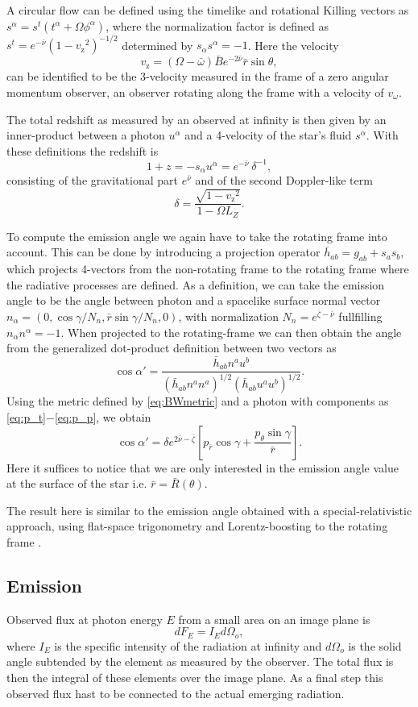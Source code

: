 \documentclass[iop, usenatbib]{emulateapj}
\newcommand{\be}{\begin{equation}}
\newcommand{\ee}{\end{equation}}
\newcommand{\rb}{\ensuremath{\bar{r}}}
\newcommand{\wb}{\ensuremath{\bar{\omega}}}
\newcommand{\nub}{\ensuremath{\bar{\nu}}}
\newcommand{\zetab}{\ensuremath{\bar{\zeta}}}
\newcommand{\Bb}{\ensuremath{\bar{B}}}
\newcommand{\vw}{\ensuremath{v_{\omega}}}
\newcommand{\vz}{\ensuremath{v_{\mathrm{z}}}}
\begin{document}
A circular flow can be defined using the timelike and rotational Killing vectors as $s^{\alpha} = s^t (t^{\alpha} + \Omega \phi^{\alpha})$, where the normalization factor is defined as $s^t = e^{-\nub} (1 - \vz^2)^{-1/2}$ determined by $s_{\alpha}s^{\alpha} = -1$.
Here the velocity 
\be
\vz = (\Omega - \wb) \Bb e^{-2\nub} \rb \sin\theta,
\ee
can be identified to be the 3-velocity measured in the frame of a zero angular momentum observer, an observer rotating along the frame with a velocity of $\vw$.

The total redshift as measured by an observed at infinity is then given by an inner-product between a photon $u^{\alpha}$ and a 4-velocity of the star's fluid $s^{\alpha}$.
With these definitions the redshift is
\be
1 + z = -s_{\alpha} u^{\alpha} = e^{-\nub} ~\delta^{-1},
\ee
consisting of the gravitational part $e^{\nub}$ and of the second Doppler-like term
\be
\delta = \frac{\sqrt{1-\vz^2}}{1 - \Omega L_Z}.
\ee

To compute the emission angle we again have to take the rotating frame into account.  
This can be done by introducing a projection operator $\bar{h}_{ab} = g_{ab} + s_a s_b$, which projects 4-vectors from the non-rotating frame to the rotating frame where the radiative processes are defined.  
As a definition, we can take the emission angle to be the angle between photon and a spacelike surface normal vector $n_{\alpha} = (0, \cos\gamma/N_n, \rb \sin\gamma/N_n, 0)$, with normalization $N_n = e^{\zetab - \nub}$ fullfilling $n_{\alpha}n^{\alpha} = -1$.  
When projected to the rotating-frame we can then obtain the angle from the generalized dot-product definition between two vectors as
\be\label{eq:gen_angle}
\cos\alpha' = \frac{\bar{h}_{ab}n^a u^b}{(\bar{h}_{ab} n^a n^a)^{1/2} (\bar{h}_{ab} u^a u^b)^{1/2}}.
\ee
Using the metric defined by \eqref{eq:BWmetric} and a photon with components as \eqref{eq:p_t}$-$\eqref{eq:p_p}, we obtain
\be
\cos\alpha' = \delta e^{2\nub-\zetab} \left[ p_{\rb} \cos\gamma + \frac{p_{\theta} \sin\gamma}{\rb} \right].
\ee
Here it suffices to notice that we are only interested in the emission angle value at the surface of the star i.e. $\rb = \bar{R}(\theta)$.

The result here is similar to the emission angle obtained with a special-relativistic approach, using flat-space trigonometry and Lorentz-boosting to the rotating frame \citep[see e.g.][]{PB06}.


\subsection{Emission}
Observed flux at photon energy $E$ from a small area on an image plane is
\be
dF_E = I_E d\Omega_o,
\ee
where $I_E$ is the specific intensity of the radiation at infinity and $d\Omega_o$ is the solid angle subtended by the element as measured by the observer. 
The total flux is then the integral of these elements over the image plane. 
As a final step this observed flux hast to be connected to the actual emerging radiation.
\end{document}
